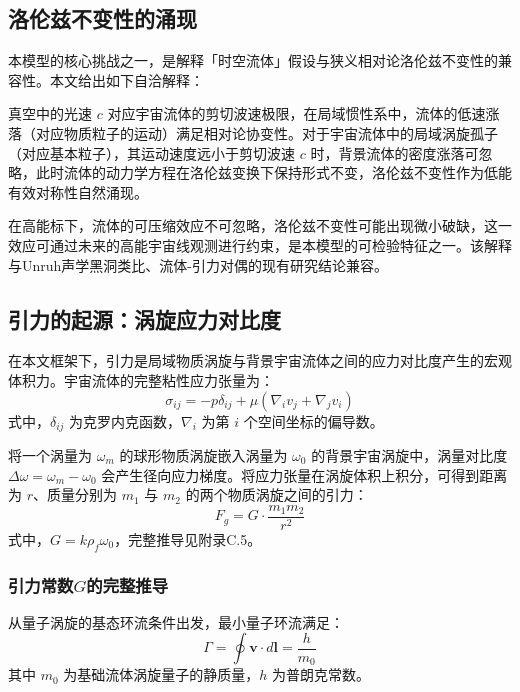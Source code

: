 \documentclass[aps,prd,preprint,superscriptaddress,floatfix]{revtex4-2}
\begin{document}
\subsection{洛伦兹不变性的涌现}
本模型的核心挑战之一，是解释「时空流体」假设与狭义相对论洛伦兹不变性的兼容性。本文给出如下自洽解释：

真空中的光速 $c$ 对应宇宙流体的剪切波速极限，在局域惯性系中，流体的低速涨落（对应物质粒子的运动）满足相对论协变性。对于宇宙流体中的局域涡旋孤子（对应基本粒子），其运动速度远小于剪切波速 $c$ 时，背景流体的密度涨落可忽略，此时流体的动力学方程在洛伦兹变换下保持形式不变，洛伦兹不变性作为低能有效对称性自然涌现。

在高能标下，流体的可压缩效应不可忽略，洛伦兹不变性可能出现微小破缺，这一效应可通过未来的高能宇宙线观测进行约束，是本模型的可检验特征之一。该解释与Unruh声学黑洞类比、流体-引力对偶的现有研究结论兼容\citep{barcelo2011analogue}。

\subsection{引力的起源：涡旋应力对比度}
在本文框架下，引力是局域物质涡旋与背景宇宙流体之间的应力对比度产生的宏观体积力。宇宙流体的完整粘性应力张量为：
\begin{equation}
\sigma_{ij}=-p\delta_{ij}+\mu \left( \nabla_{i}v_{j}+\nabla_{j}v_{i}\right)
\label{eq:stress_tensor}
\end{equation}
式中，$\delta_{ij}$ 为克罗内克函数，$\nabla_{i}$ 为第 $i$ 个空间坐标的偏导数。

将一个涡量为 $\omega_{m}$ 的球形物质涡旋嵌入涡量为 $\omega_{0}$ 的背景宇宙涡旋中，涡量对比度 $\Delta \omega=\omega_{m}-\omega_{0}$ 会产生径向应力梯度。将应力张量在涡旋体积上积分，可得到距离为 $r$、质量分别为 $m_{1}$ 与 $m_{2}$ 的两个物质涡旋之间的引力：
\begin{equation}
F_{g}=G \cdot \frac{m_{1} m_{2}}{r^{2}}
\label{eq:newton_gravity}
\end{equation}
式中，$G=k \rho_{f} \omega_{0}$，完整推导见附录C.5。

\subsubsection{引力常数$G$的完整推导}
从量子涡旋的基态环流条件出发，最小量子环流满足：
\begin{equation}
\Gamma=\oint \boldsymbol{v} \cdot d \boldsymbol{l}=\frac{h}{m_{0}}
\label{eq:circulation}
\end{equation}
其中 $m_{0}$ 为基础流体涡旋量子的静质量，$h$ 为普朗克常数。
\end{document}
